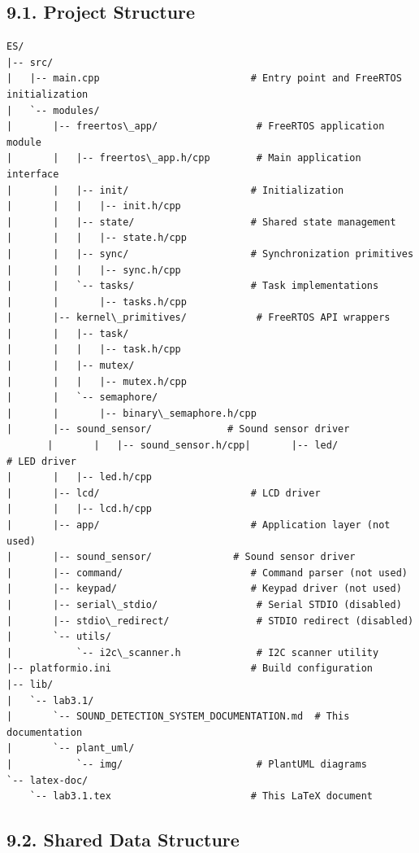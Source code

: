 \documentclass[12pt]{article}
\begin{document}
\subsection*{9.1. Project Structure}

\begin{verbatim}
ES/
|-- src/
|   |-- main.cpp                          # Entry point and FreeRTOS initialization
|   `-- modules/
|       |-- freertos\_app/                 # FreeRTOS application module
|       |   |-- freertos\_app.h/cpp        # Main application interface
|       |   |-- init/                     # Initialization
|       |   |   |-- init.h/cpp
|       |   |-- state/                    # Shared state management
|       |   |   |-- state.h/cpp
|       |   |-- sync/                     # Synchronization primitives
|       |   |   |-- sync.h/cpp
|       |   `-- tasks/                    # Task implementations
|       |       |-- tasks.h/cpp
|       |-- kernel\_primitives/            # FreeRTOS API wrappers
|       |   |-- task/
|       |   |   |-- task.h/cpp
|       |   |-- mutex/
|       |   |   |-- mutex.h/cpp
|       |   `-- semaphore/
|       |       |-- binary\_semaphore.h/cpp
|       |-- sound_sensor/             # Sound sensor driver
       |       |   |-- sound_sensor.h/cpp|       |-- led/                          # LED driver
|       |   |-- led.h/cpp
|       |-- lcd/                          # LCD driver
|       |   |-- lcd.h/cpp
|       |-- app/                          # Application layer (not used)
|       |-- sound_sensor/              # Sound sensor driver
|       |-- command/                      # Command parser (not used)
|       |-- keypad/                       # Keypad driver (not used)
|       |-- serial\_stdio/                 # Serial STDIO (disabled)
|       |-- stdio\_redirect/               # STDIO redirect (disabled)
|       `-- utils/
|           `-- i2c\_scanner.h             # I2C scanner utility
|-- platformio.ini                        # Build configuration
|-- lib/
|   `-- lab3.1/
|       `-- SOUND_DETECTION_SYSTEM_DOCUMENTATION.md  # This documentation
|       `-- plant_uml/
|           `-- img/                       # PlantUML diagrams
`-- latex-doc/
    `-- lab3.1.tex                        # This LaTeX document
\end{verbatim}

\subsection*{9.2. Shared Data Structure}
\end{document}

